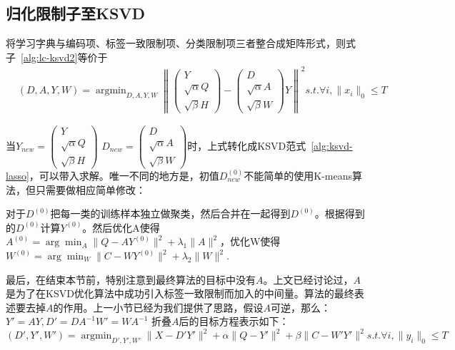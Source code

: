    \subsection{归化限制子至KSVD}

    将学习字典与编码项、标签一致限制项、分类限制项三者整合成矩阵形式，则式子~\ref{alg:lc-ksvd2}等价于
    \begin{equation}
    \begin{split}
    & (D, A, Y, W) = \mathop{\arg\min}_{D, A, Y, W} \left\|\begin{pmatrix} Y \\ \sqrt{\alpha} Q \\ \sqrt{\beta}H\end{pmatrix} - \begin{pmatrix} D \\ \sqrt{\alpha} A \\ \sqrt{\beta}W\end{pmatrix} Y\right\| ^2 s.t. \forall i, \|x_i\|_0 \le T
    \end{split}
    \end{equation}

    当$Y_{new} = \begin{pmatrix} Y \\ \sqrt{\alpha} Q \\ \sqrt{\beta}H\end{pmatrix}$ $D_{new} = \begin{pmatrix} D \\ \sqrt{\alpha} A \\ \sqrt{\beta}W\end{pmatrix}$时，上式转化成KSVD范式~\ref{alg:ksvd-lasso}，可以带入求解。唯一不同的地方是，初值$D_{new}^{(0)}$不能简单的使用K-means算法，但只需要做相应简单修改：

    对于$D^{(0)}$把每一类的训练样本独立做聚类，然后合并在一起得到$D^{(0)}$。根据得到的$D^{(0)}$计算$Y^{(0)}$。然后优化A使得 $A^{(0)} = \arg\min _{A} \|Q - AY^{(0)}\|^2 + \lambda_1 \|A\|^2$，优化W使得$W^{(0)} = \arg\min_{W} \|C - WY^{(0)}\|^2+ \lambda_2\|W\|^2$.

    最后，在结束本节前，特别注意到最终算法的目标中没有$A$。上文已经讨论过，$A$是为了在KSVD优化算法中成功引入标签一致限制而加入的中间量。算法的最终表述要去掉$A$的作用。上一小节已经为我们提供了思路，假设$A$可逆，那么：$Y' = AY, D' = D A^{-1} W' = W A^{-1}$ 折叠$A$后的目标方程表示如下：
    \begin{equation}
    \label{alg:lc-ksvd3}
    (D', Y', W') = \mathop{\arg\min}_{D', Y', W'} \| X - D'Y'\|^2 + \alpha \|Q - Y'\| ^2 + \beta\|C - W' Y' \| ^2 s.t. \forall i, \|y_i\|_0 \le T 
    \end{equation}

